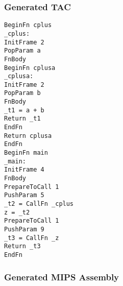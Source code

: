 \subsubsection{Generated TAC}
\begin{lstlisting}[showstringspaces=false,breaklines=true,backgroundcolor=\color{light-gray}, captionpos=b]
BeginFn cplus
_cplus:
InitFrame 2
PopParam a
FnBody
BeginFn cplusa
_cplusa:
InitFrame 2
PopParam b
FnBody
_t1 = a + b
Return _t1
EndFn
Return cplusa
EndFn
BeginFn main
_main:
InitFrame 4
FnBody
PrepareToCall 1
PushParam 5
_t2 = CallFn _cplus
z = _t2
PrepareToCall 1
PushParam 9
_t3 = CallFn _z
Return _t3
EndFn

\end{lstlisting}\subsubsection{Generated MIPS Assembly}
